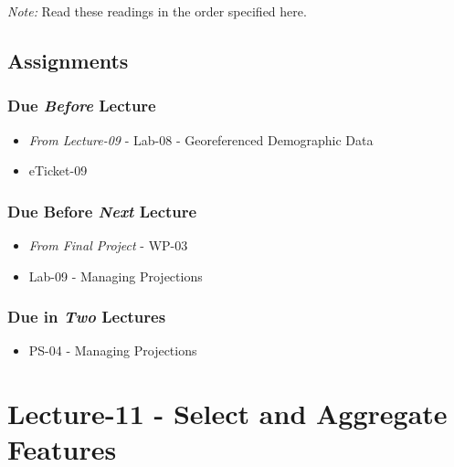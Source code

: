 \documentclass[
]{book}
\providecommand{\tightlist}{%
  \setlength{\itemsep}{0pt}\setlength{\parskip}{0pt}}
\begin{document}
\emph{Note:} Read these readings in the order specified here.

\hypertarget{assignments-11}{%
\subsection*{Assignments}\label{assignments-11}}

\hypertarget{due-before-lecture-9}{%
\subsubsection*{\texorpdfstring{Due \emph{Before} Lecture}{Due Before Lecture}}\label{due-before-lecture-9}}

\begin{itemize}
\tightlist
\item
  \emph{From Lecture-09} - Lab-08 - Georeferenced Demographic Data
\item
  eTicket-09
\end{itemize}

\hypertarget{due-before-next-lecture-8}{%
\subsubsection*{\texorpdfstring{Due Before \emph{Next} Lecture}{Due Before Next Lecture}}\label{due-before-next-lecture-8}}

\begin{itemize}
\tightlist
\item
  \emph{From Final Project} - WP-03
\item
  Lab-09 - Managing Projections
\end{itemize}

\hypertarget{due-in-two-lectures-4}{%
\subsubsection*{\texorpdfstring{Due in \emph{Two} Lectures}{Due in Two Lectures}}\label{due-in-two-lectures-4}}

\begin{itemize}
\tightlist
\item
  PS-04 - Managing Projections
\end{itemize}

\hypertarget{lecture-11---select-and-aggregate-features}{%
\section*{Lecture-11 - Select and Aggregate Features}\label{lecture-11---select-and-aggregate-features}}
\end{document}
